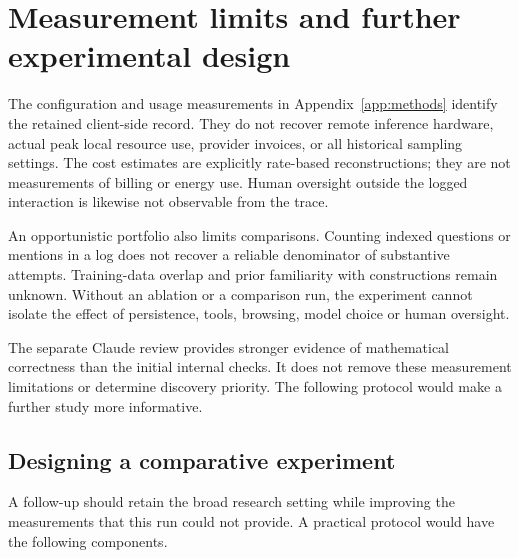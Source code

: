 \section{Measurement limits and further experimental design}
\label{app:evaluation}

The configuration and usage measurements in Appendix~\ref{app:methods}
identify the retained client-side record. They do not recover remote
inference hardware, actual peak local resource use, provider invoices,
or all historical sampling settings. The cost estimates are explicitly
rate-based reconstructions; they are not measurements of billing or
energy use. Human oversight outside the logged interaction is likewise
not observable from the trace.

An opportunistic portfolio also limits comparisons. Counting indexed
questions or mentions in a log does not recover a reliable denominator
of substantive attempts. Training-data overlap and prior familiarity
with constructions remain unknown. Without an ablation or a comparison
run, the experiment cannot isolate the effect of persistence, tools,
browsing, model choice or human oversight.

The separate Claude review provides stronger evidence of mathematical
correctness than the initial internal checks. It does not remove these
measurement limitations or determine discovery priority. The following
protocol would make a further study more informative.

\subsection{Designing a comparative experiment}

A follow-up should retain the broad research setting while improving
the measurements that this run could not provide. A practical protocol
would have the following components.

